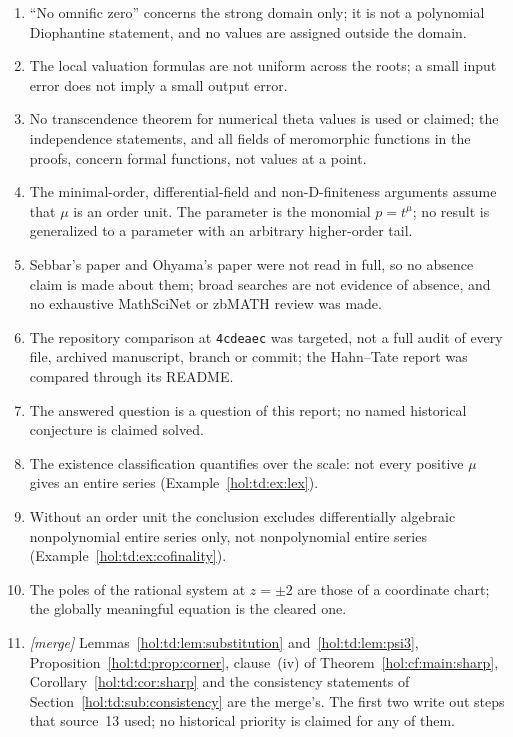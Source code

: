 \documentclass[11pt]{article}
\numberwithin{equation}{section}
\theoremstyle{definition}
\theoremstyle{remark}
\begin{document}
\begin{enumerate}[label=\textup{(T\arabic*)}]
\item ``No omnific zero'' concerns the strong domain only; it is not a
polynomial Diophantine statement, and no values are assigned outside the
domain.
\item The local valuation formulas are not uniform across the roots; a small
input error does not imply a small output error.
\item No transcendence theorem for numerical theta values is used or claimed;
the independence statements, and all fields of meromorphic functions in the
proofs, concern formal functions, not values at a point.
\item The minimal-order, differential-field and non-D-finiteness arguments
assume that $\mu$ is an order unit. The parameter is the monomial $p=t^\mu$;
no result is generalized to a parameter with an arbitrary higher-order tail.
\item Sebbar's paper and Ohyama's paper were not read in full, so no absence
claim is made about them; broad searches are not evidence of absence, and no
exhaustive MathSciNet or zbMATH review was made.
\item The repository comparison at \texttt{4cdeaec} was targeted, not a full
audit of every file, archived manuscript, branch or commit; the Hahn--Tate
report was compared through its README.
\item The answered question is a question of this report; no named historical
conjecture is claimed solved.
\item The existence classification quantifies over the scale: not every
positive $\mu$ gives an entire series (Example~\ref{hol:td:ex:lex}).
\item Without an order unit the conclusion excludes differentially algebraic
nonpolynomial entire series only, not nonpolynomial entire series
(Example~\ref{hol:td:ex:cofinality}).
\item The poles of the rational system at $z=\pm2$ are those of a coordinate
chart; the globally meaningful equation is the cleared one.
\item \emph{[merge]} Lemmas~\ref{hol:td:lem:substitution}
and~\ref{hol:td:lem:psi3}, Proposition~\ref{hol:td:prop:corner}, clause~(iv) of
Theorem~\ref{hol:cf:main:sharp}, Corollary~\ref{hol:td:cor:sharp} and the
consistency statements of Section~\ref{hol:td:sub:consistency} are the
merge's. The first two write out steps that source~13 used; no historical
priority is claimed for any of them.
\end{enumerate}
\end{document}
